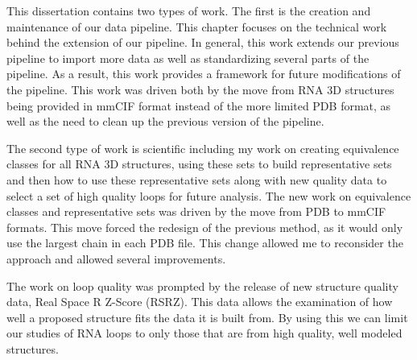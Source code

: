 This dissertation contains two types of work. The first is the creation and
maintenance of our data pipeline. This chapter focuses on the technical work
behind the extension of our pipeline. In general, this work extends our
previous pipeline to import more data as well as standardizing several parts of
the pipeline. As a result, this work provides a framework for future
modifications of the pipeline. This work was driven both by the move from RNA
3D structures being provided in mmCIF format instead of the more limited PDB
format, as well as the need to clean up the previous version of the pipeline.

The second type of work is scientific including my work on creating equivalence
classes for all RNA 3D structures, using these sets to build representative
sets and then how to use these representative sets along with new quality data
to select a set of high quality loops for future analysis. The new work on
equivalence classes and representative sets was driven by the move from PDB to
mmCIF formats. This move forced the redesign of the previous method, as it
would only use the largest chain in each PDB file. This change allowed me
to reconsider the approach and allowed several improvements. 

The work on loop quality was prompted by the release of new structure quality
data, Real Space R Z-Score (RSRZ). This data allows the examination of how well
a proposed structure fits the data it is built from. By using this we can limit
our studies of RNA loops to only those that are from high quality, well modeled
structures. 

